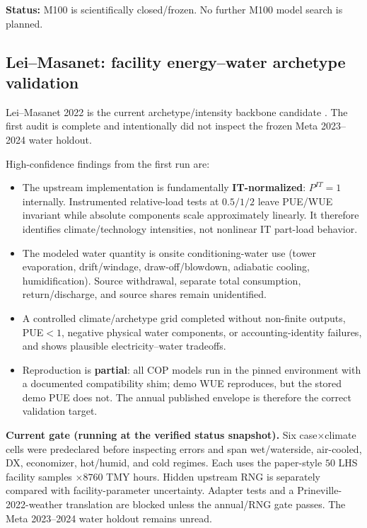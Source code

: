 \documentclass[11pt]{article}
\begin{document}
\textbf{Status:} M100 is scientifically closed/frozen. No further M100 model search is planned.

\subsection{Lei--Masanet: facility energy--water archetype validation}

Lei--Masanet 2022 is the current archetype/intensity backbone candidate \cite{lei2022}. The first audit is complete and intentionally did not inspect the frozen Meta 2023--2024 water holdout.

High-confidence findings from the first run are:
\begin{itemize}
\item The upstream implementation is fundamentally \textbf{IT-normalized}: $P^{IT}=1$ internally. Instrumented relative-load tests at $0.5/1/2$ leave PUE/WUE invariant while absolute components scale approximately linearly. It therefore identifies climate/technology intensities, not nonlinear IT part-load behavior.
\item The modeled water quantity is onsite conditioning-water use (tower evaporation, drift/windage, draw-off/blowdown, adiabatic cooling, humidification). Source withdrawal, separate total consumption, return/discharge, and source shares remain unidentified.
\item A controlled climate/archetype grid completed without non-finite outputs, PUE$<1$, negative physical water components, or accounting-identity failures, and shows plausible electricity--water tradeoffs.
\item Reproduction is \textbf{partial}: all COP models run in the pinned environment with a documented compatibility shim; demo WUE reproduces, but the stored demo PUE does not. The annual published envelope is therefore the correct validation target.
\end{itemize}

\textbf{Current gate (running at the verified status snapshot).} Six case$\times$climate cells were predeclared before inspecting errors and span wet/waterside, air-cooled, DX, economizer, hot/humid, and cold regimes. Each uses the paper-style $50$ LHS facility samples $\times8760$ TMY hours. Hidden upstream RNG is separately compared with facility-parameter uncertainty. Adapter tests and a Prineville-2022-weather translation are blocked unless the annual/RNG gate passes. The Meta 2023--2024 water holdout remains unread.
\end{document}
